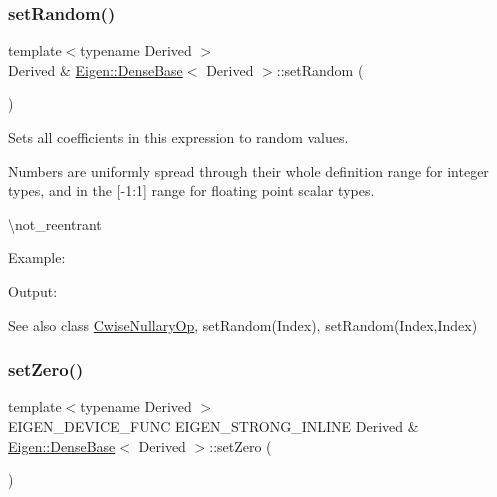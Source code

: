 \subsubsection{\texorpdfstring{setRandom()}{setRandom()}}
{\footnotesize\ttfamily template$<$typename Derived $>$ \\
Derived \& \mbox{\hyperlink{class_eigen_1_1_dense_base}{Eigen\+::\+Dense\+Base}}$<$ Derived $>$\+::set\+Random (\begin{DoxyParamCaption}{ }\end{DoxyParamCaption})\hspace{0.3cm}{\ttfamily [inline]}}

Sets all coefficients in this expression to random values.

Numbers are uniformly spread through their whole definition range for integer types, and in the \mbox{[}-\/1\+:1\mbox{]} range for floating point scalar types.

\textbackslash{}not\+\_\+reentrant

Example\+: 
\begin{DoxyCodeInclude}{0}
\end{DoxyCodeInclude}
 Output\+: 
\begin{DoxyVerbInclude}
\end{DoxyVerbInclude}


\begin{DoxySeeAlso}{See also}
class \mbox{\hyperlink{class_eigen_1_1_cwise_nullary_op}{Cwise\+Nullary\+Op}}, set\+Random(\+Index), set\+Random(\+Index,\+Index) 
\end{DoxySeeAlso}
\mbox{\label{class_eigen_1_1_dense_base_ac74411ddeea2545bf20baf14613be47e}} 
\subsubsection{\texorpdfstring{setZero()}{setZero()}}
{\footnotesize\ttfamily template$<$typename Derived $>$ \\
E\+I\+G\+E\+N\+\_\+\+D\+E\+V\+I\+C\+E\+\_\+\+F\+U\+NC E\+I\+G\+E\+N\+\_\+\+S\+T\+R\+O\+N\+G\+\_\+\+I\+N\+L\+I\+NE Derived \& \mbox{\hyperlink{class_eigen_1_1_dense_base}{Eigen\+::\+Dense\+Base}}$<$ Derived $>$\+::set\+Zero (\begin{DoxyParamCaption}{ }\end{DoxyParamCaption})}

